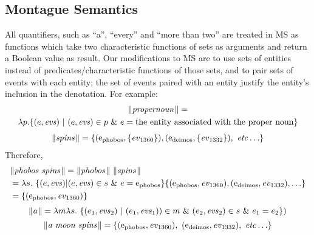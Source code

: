 \documentclass[../main.tex]{subfiles}
\begin{document}
\begin{refsection}
\subsection{Montague Semantics}

All quantifiers, such as ``a'', ``every'' and ``more than two'' are treated in MS as functions which take two characteristic functions of sets as arguments and return a Boolean value as result. Our modifications to MS are to use sets of entities instead of predicates/characteristic functions of those sets, and to pair sets of events with each entity; the set of events paired with an entity justify the entity’s inclusion in the denotation. For example:
\begin{multline*}
	\lVert\textit{propernoun\hspace{0.1em}}\rVert = \\ \lambda p.
	\{(e, \operatorname{\mathit{evs}})\ |\ (e, \operatorname{\mathit{evs}}) \in p\ \&\ e = \text{the entity associated with the proper noun}\}
\end{multline*}
\begin{equation*}
	\begin{split}
		\lVert\textit{spins\hspace{0.1em}}\rVert = \{(\mathrm{e}_{\operatorname{phobos}}, \{\operatorname{\mathit{ev}}_{1360}\}),
		(\mathrm{e}_{\operatorname{deimos}}, \{\operatorname{\mathit{ev}}_{1332}\}),\ \operatorname{\mathit{etc\ldots}}\}
	\end{split}
\end{equation*}
Therefore,
\begin{equation*}
	\begin{split}
		& \lVert\textit{phobos spins\hspace{0.1em}}\rVert = \lVert\textit{phobos\hspace{0.1em}}\rVert\ \lVert\textit{spins\hspace{0.1em}}\rVert \\
		& = \lambda s.\ \{(e, \operatorname{\mathit{evs}}) | (e, \operatorname{\mathit{evs}}) \in s\ \&\ e = \mathrm{e}_{\operatorname{phobos}}\}
		 \{(\mathrm{e}_{\operatorname{phobos}},{\operatorname{\mathit{ev}}_{1360}}), (\mathrm{e}_{\operatorname{deimos}}, \operatorname{\mathit{ev}}_{1332}), \ldots\} \\
		& = \{(\mathrm{e}_{\operatorname{phobos}}, \operatorname{\mathit{ev}}_{1360})\}
	\end{split}
\end{equation*}
\begin{equation*} %
	\meaningof{a} = \lambda m \lambda s.\ \{(e_1,\evs_2)\ |\ (e_1,\evs_1) )\in m\
	\&\ (e_2,\evs_2) \in s\ \&\ e_1 = e_2\})
\end{equation*}
\begin{equation*}
	\lVert\textit{a\ moon\ spins\hspace{0.1em}}\rVert =
	\{(\mathrm{e}_{\operatorname{phobos}}, \operatorname{\mathit{ev}}_{1360}),\ (\mathrm{e}_{\operatorname{deimos}}, \operatorname{\mathit{ev}}_{1332}),\ \operatorname{\mathit{etc\ldots}}\}
\end{equation*}




\end{refsection}
\end{document}

